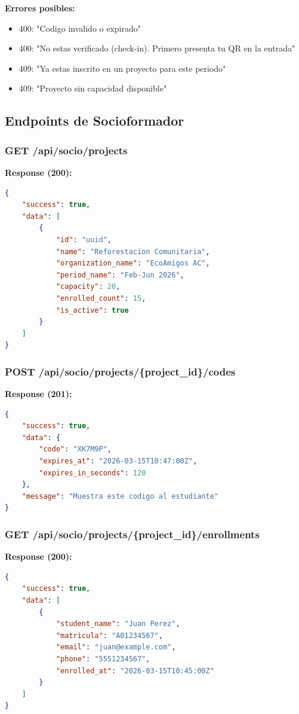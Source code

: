 \documentclass[12pt,a4paper]{article}
\begin{document}
\textbf{Errores posibles:}
\begin{itemize}[leftmargin=*]
    \item 400: "Codigo invalido o expirado"
    \item 400: "No estas verificado (check-in). Primero presenta tu QR en la entrada"
    \item 409: "Ya estas inscrito en un proyecto para este periodo"
    \item 409: "Proyecto sin capacidad disponible"
\end{itemize}

\subsection{Endpoints de Socioformador}

\subsubsection{GET /api/socio/projects}

\textbf{Response (200):}
\begin{lstlisting}[language=json]
{
    "success": true,
    "data": [
        {
            "id": "uuid",
            "name": "Reforestacion Comunitaria",
            "organization_name": "EcoAmigos AC",
            "period_name": "Feb-Jun 2026",
            "capacity": 20,
            "enrolled_count": 15,
            "is_active": true
        }
    ]
}
\end{lstlisting}

\subsubsection{POST /api/socio/projects/\{project\_id\}/codes}

\textbf{Response (201):}
\begin{lstlisting}[language=json]
{
    "success": true,
    "data": {
        "code": "XK7M9P",
        "expires_at": "2026-03-15T10:47:00Z",
        "expires_in_seconds": 120
    },
    "message": "Muestra este codigo al estudiante"
}
\end{lstlisting}

\subsubsection{GET /api/socio/projects/\{project\_id\}/enrollments}

\textbf{Response (200):}
\begin{lstlisting}[language=json]
{
    "success": true,
    "data": [
        {
            "student_name": "Juan Perez",
            "matricula": "A01234567",
            "email": "juan@example.com",
            "phone": "5551234567",
            "enrolled_at": "2026-03-15T10:45:00Z"
        }
    ]
}
\end{lstlisting}
\end{document}
